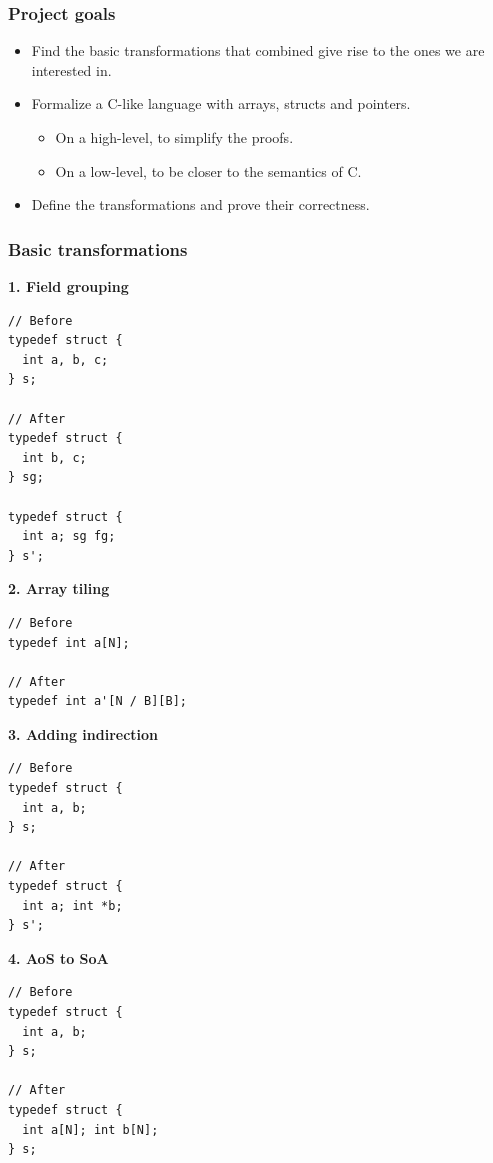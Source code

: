 \begin{frame}[fragile]
\frametitle{Project goals}

\begin{itemize}
	\setlength\itemsep{1.5em}
	\item Find the basic transformations that combined give rise to the ones we are interested in.\\
	\item Formalize a C-like language with arrays, structs and pointers.
	\begin{itemize}
		\item On a high-level, to simplify the proofs.
		\item On a low-level, to be closer to the semantics of C.
	\end{itemize}
	\item Define the transformations and prove their correctness.
\end{itemize}

\end{frame}


\begin{frame}[fragile]
\frametitle{Basic transformations}

\begin{center}
\begin{minipage}{0.45\linewidth}
\textbf{\small 1. Field grouping}
\begin{lstlisting}[style=Cstyle, basicstyle=\scriptsize]
// Before
typedef struct {
  int a, b, c;
} s;

// After
typedef struct {
  int b, c;
} sg;

typedef struct {
  int a; sg fg;
} s';
\end{lstlisting}
\textbf{\small 2. Array tiling}
\begin{lstlisting}[style=Cstyle, basicstyle=\scriptsize]
// Before
typedef int a[N];

// After
typedef int a'[N / B][B];
\end{lstlisting}
\end{minipage}%
\begin{minipage}{0.45\linewidth}
\textbf{\small 3. Adding indirection}
\begin{lstlisting}[style=Cstyle, basicstyle=\scriptsize]
// Before
typedef struct {
  int a, b;
} s;

// After
typedef struct {
  int a; int *b;
} s';
\end{lstlisting}
\textbf{\small 4. AoS to SoA}
\begin{lstlisting}[style=Cstyle, basicstyle=\scriptsize]
// Before
typedef struct {
  int a, b;
} s;

// After
typedef struct {
  int a[N]; int b[N];
} s;
\end{lstlisting}
\end{minipage}
\end{center}

\end{frame}


